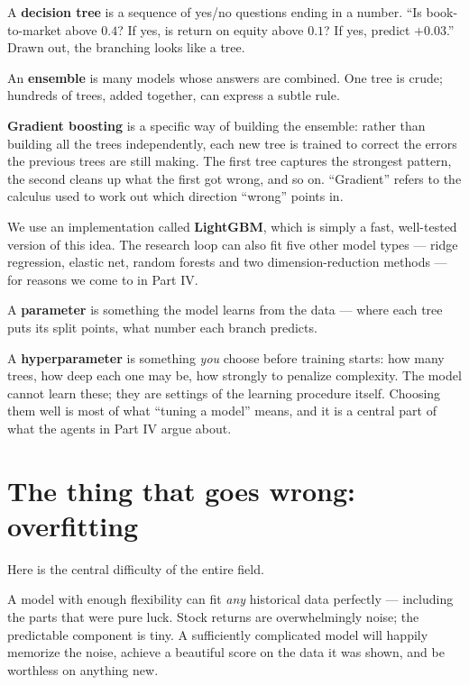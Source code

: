 \documentclass[11pt]{article}
\begin{document}
\begin{specbox}
A \textbf{decision tree} is a sequence of yes/no questions ending in a number.
``Is book-to-market above $0.4$? If yes, is return on equity above $0.1$? If yes,
predict $+0.03$.'' Drawn out, the branching looks like a tree.

An \textbf{ensemble} is many models whose answers are combined. One tree is crude;
hundreds of trees, added together, can express a subtle rule.

\textbf{Gradient boosting} is a specific way of building the ensemble: rather than
building all the trees independently, each new tree is trained to correct the errors
the previous trees are still making. The first tree captures the strongest pattern,
the second cleans up what the first got wrong, and so on. ``Gradient'' refers to the
calculus used to work out which direction ``wrong'' points in.
\end{specbox}

We use an implementation called \textbf{LightGBM}, which is simply a fast, well-tested
version of this idea. The research loop can also fit five other model types --- ridge
regression, elastic net, random forests and two dimension-reduction methods --- for
reasons we come to in Part IV.

\begin{specbox}
A \textbf{parameter} is something the model learns from the data --- where each tree
puts its split points, what number each branch predicts.

A \textbf{hyperparameter} is something \emph{you} choose before training starts: how
many trees, how deep each one may be, how strongly to penalize complexity. The model
cannot learn these; they are settings of the learning procedure itself. Choosing them
well is most of what ``tuning a model'' means, and it is a central part of what the
agents in Part IV argue about.
\end{specbox}

\section{The thing that goes wrong: overfitting}

Here is the central difficulty of the entire field.

A model with enough flexibility can fit \emph{any} historical data perfectly ---
including the parts that were pure luck. Stock returns are overwhelmingly noise; the
predictable component is tiny. A sufficiently complicated model will happily memorize
the noise, achieve a beautiful score on the data it was shown, and be worthless on
anything new.
\end{document}
